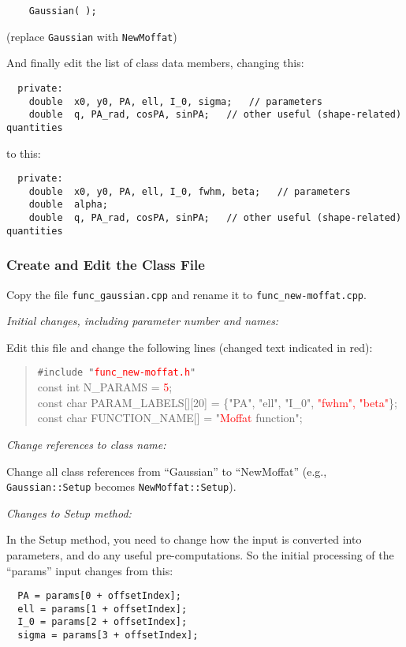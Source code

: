\documentclass[10pt,a4paper,article]{memoir}
\newcommand{\red}{\textcolor{red}}
\begin{document}
\begin{verbatim}
    Gaussian( );
\end{verbatim}
(replace \texttt{Gaussian} with \texttt{NewMoffat})

And finally edit the list of class data members, changing this:
\begin{verbatim}
  private:
    double  x0, y0, PA, ell, I_0, sigma;   // parameters
    double  q, PA_rad, cosPA, sinPA;   // other useful (shape-related) quantities
\end{verbatim}
to this:
\begin{verbatim}
  private:
    double  x0, y0, PA, ell, I_0, fwhm, beta;   // parameters
    double  alpha;
    double  q, PA_rad, cosPA, sinPA;   // other useful (shape-related) quantities
\end{verbatim}


\subsubsection{Create and Edit the Class File}

Copy the file \texttt{func\_gaussian.cpp} and rename it to \texttt{func\_new-moffat.cpp}. 

\bigskip
\noindent \textit{Initial changes, including parameter number and names:}
\smallskip

Edit this file and change the following lines (changed text indicated in red):

\begin{quote}
\texttt{\#include "\red{func\_new-moffat.h}"} \\

const int  N\_PARAMS = \red{5}; \\

const char  PARAM\_LABELS[][20] = \{"PA", "ell", "I\_0", \red{"fwhm", "beta"}\}; \\

const char  FUNCTION\_NAME[] = "\red{Moffat} function";

\end{quote}

\bigskip
\noindent \textit{Change references to class name:}
\smallskip

Change all class references from ``Gaussian'' to ``NewMoffat'' (e.g.,
\texttt{Gaussian::Setup} becomes \texttt{NewMoffat::Setup}).

\bigskip
\noindent \textit{Changes to Setup method:}
\smallskip

In the Setup method, you need to change how the input is converted into
parameters, and do any useful pre-computations. So the initial processing of
the ``params'' input changes from this:
\begin{verbatim}
  PA = params[0 + offsetIndex];
  ell = params[1 + offsetIndex];
  I_0 = params[2 + offsetIndex];
  sigma = params[3 + offsetIndex];
\end{verbatim}
\end{document}
